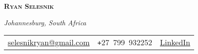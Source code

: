 \documentclass[10pt, a4paper]{article}
\begin{document}
\begin{center}
 \textsc{\textbf{\huge Ryan Selesnik}}

\vspace{.2em}
\footnotesize{\textit{Johannesburg, South Africa}}
\\
\vspace{.25em}
\centering
\footnotesize{
\begin{tabular}{c|c|c}

 \href{mailto:selesnikryan@gmail.com}{selesnikryan@gmail.com}     &  \texttt{+}27~799~932252  & \href{https://www.linkedin.com/in/ryan-s-09850613b/}{LinkedIn} 
    
\end{tabular}}

\end{center}
\end{document}
